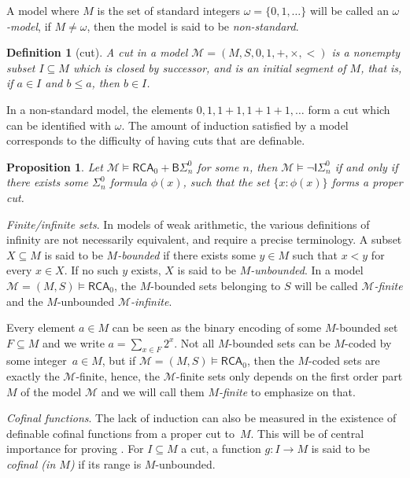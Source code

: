 \documentclass{article}
\def\M{\mathcal{M}}
\newcommand{\ISig}{\mathsf{I}\Sigma^0}
\newcommand{\BSig}{\mathsf{B}\Sigma^0}
\newcommand{\RCA}[0]{\mathsf{RCA}}
\numberwithin{theorem}{section}
\newtheorem{proposition}[theorem]{Proposition}
\newtheorem{definition}[theorem]{Definition}
\begin{document}
A model where $M$ is the set of standard integers $\omega = \{0, 1, \dots \}$ will be called an \emph{$\omega$-model}, if $M \neq \omega$, then the model is said to be \emph{non-standard}.

\begin{definition}[cut] 
    A \emph{cut} in a model $\M = (M, S, 0, 1, +, \times, <)$ is a nonempty subset $I \subseteq M$ which is closed by successor, and is an initial segment of $M$, that is, if $a \in I$ and $b \leq a$, then $b \in I$.
\end{definition}

In a non-standard model, the elements $0, 1, 1 + 1, 1 + 1 + 1, \dots$ form a cut which can be identified with $\omega$. The amount of induction satisfied by a model corresponds to the difficulty of having cuts that are definable.

\begin{proposition}
    Let $\M \models \RCA_0 + \BSig_n$ for some $n$, then $\M \models \neg \ISig_n$ if and only if there exists some $\Sigma_n^0$ formula $\phi(x)$, such that the set $\{x : \phi(x)\}$ forms a proper cut.
\end{proposition}

\noindent
\emph{Finite/infinite sets}. In models of weak arithmetic, the various definitions of infinity are not necessarily equivalent, and require a precise terminology.
A subset $X \subseteq M$ is said to be \emph{$M$-bounded} if there exists some $y \in M$ such that $x < y$ for every $x \in X$. If no such $y$ exists, $X$ is said to be \emph{$M$-unbounded}. In a model $\M = (M, S) \models \RCA_0$, the $M$-bounded sets belonging to $S$ will be called \emph{$\M$-finite} and the $M$-unbounded \emph{$\M$-infinite}.

Every element $a \in M$ can be seen as the binary encoding of some $M$-bounded set $F \subseteq M$ and we write $a = \sum_{x \in F} 2^x$. Not all $M$-bounded sets can be $M$-coded by some integer~$a \in M$, but if $\M = (M, S) \models \RCA_0$, then the $M$-coded sets are exactly the $\M$-finite, hence, the $\M$-finite sets only depends on the first order part $M$ of the model $\M$ and we will call them \emph{$M$-finite} to emphasize on that.
\smallskip

\noindent
\emph{Cofinal functions}. The lack of induction can also be measured in the existence of definable cofinal functions from a proper cut to~$M$. This will be of central importance for proving .
For $I \subseteq M$ a cut, a function $g : I \to M$ is said to be \emph{cofinal (in $M$)} if its range is $M$-unbounded.
\end{document}

